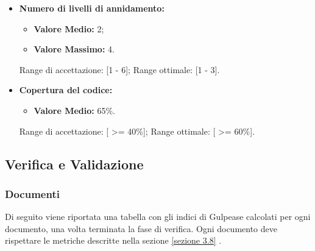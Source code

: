 \begin{itemize}
	\item \textbf{Numero di livelli di annidamento:}
	\begin{itemize}
		\item \textbf{Valore Medio:} 2;
		\item \textbf{Valore Massimo:} 4.
	\end{itemize}

Range di accettazione: [1 - 6];\newline
Range ottimale: [1 - 3].


	\item \textbf{Copertura del codice:}
	\begin{itemize}
		\item \textbf{Valore Medio:} 65\%.
	\end{itemize}

Range di accettazione: [ >= 40\%];\newline
Range ottimale: [ >= 60\%].

\end{itemize}

\subsection{Verifica e Validazione}
\subsubsection{Documenti}
\label{appendice 8}

Di seguito viene riportata una tabella con gli indici di Gulpease calcolati per ogni documento, una volta terminata la fase di verifica. Ogni documento deve rispettare le metriche descritte nella sezione \ref{sezione 3.8} .\\

\hspace{1cm}

